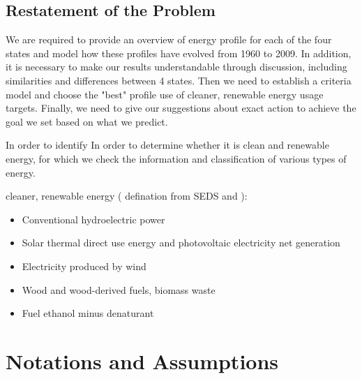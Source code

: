 \documentclass{mcmthesis}
\begin{document}
    \subsection{Restatement of the Problem}
    We are required to provide an overview of energy profile for each of the four states and model how these profiles have evolved from 1960 to 2009. In addition, it is necessary to make our results understandable through discussion, including similarities and differences between 4 states. Then we need to establish a criteria model and choose the "best" profile use of cleaner, renewable energy usage targets. Finally, we need to give our suggestions about exact action to achieve the goal we set based on what we predict.

    In order to identify
    In order to determine whether it is clean and renewable energy, for which we check the information and classification of various types of energy.


    \noindent
    cleaner, renewable energy ( defination from SEDS and ):
    \begin{itemize}
      \item Conventional hydroelectric power
      \item Solar thermal direct use energy and photovoltaic electricity net generation
      \item Electricity produced by wind
      \item Wood and wood-derived fuels, biomass waste
      \item Fuel ethanol minus denaturant
    \end{itemize}

\section{Notations and Assumptions}
\end{document}
